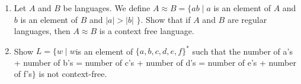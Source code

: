 \documentclass{article}
\begin{document}
\begin{enumerate}
        \item Let $A$ and $B$ be languages. We define $A\approx B = \{ab \mid a $ is an element of $A$ and $b$ is an element of $B$ and $|a| > |b|$ $\}$. Show that if $A$ and $B$ are regular languages, then $A\approx B$ is a context free language.

        \item Show $L = \{w\mid w $is an element of $\{a,b,c,d,e,f\}^*$ such that the number of a's + number of b's = number of c's + number of d's = number of e's + number of f's$ \}$ is not context-free.
    \end{enumerate}
\end{document}

